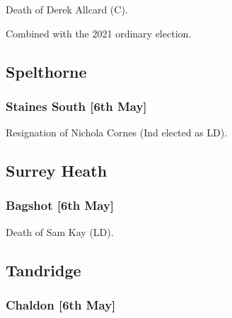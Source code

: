 \documentclass[a4paper,openany]{book}
\begin{document}
\begin{resultsiii}

Death of Derek Allcard (C).

Combined with the 2021 ordinary election.

\subsection*{Spelthorne}

\subsubsection*{Staines South \hspace*{\fill}\nolinebreak[1]%
	\enspace\hspace*{\fill}
	[6th May]}


Resignation of Nichola Cornes (Ind elected as LD).

\subsection*{Surrey Heath}

\subsubsection*{Bagshot \hspace*{\fill}\nolinebreak[1]%
	\enspace\hspace*{\fill}
	[6th May]}


Death of Sam Kay (LD).

\subsection*{Tandridge}

\subsubsection*{Chaldon \hspace*{\fill}\nolinebreak[1]%
	\enspace\hspace*{\fill}
	[6th May]}



\end{resultsiii}
\end{document}

